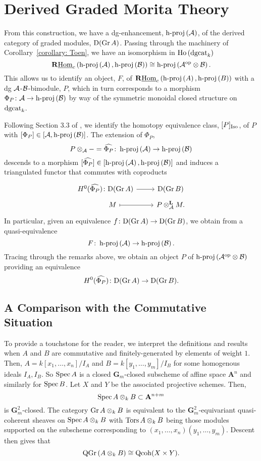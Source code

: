 \section{Derived Graded Morita Theory}
From this construction, we have a dg-enhancement, \(\operatorname{h-proj}\left(\mathcal{A}\right)\), of the derived category of graded modules, \(\mathrm{D}(\operatorname{Gr}A)\).
Passing through the machinery of Corollary~\ref{corollary: Toen}, we have an isomorphism in \(\operatorname{Ho}\left(\operatorname{dgcat}_k\right)\)
\[\mathbf{R}\underline{\operatorname{Hom}}_c\left(\operatorname{h-proj}\left(\mathcal{A}\right), \operatorname{h-proj}\left(\mathcal{B}\right)\right) \cong \operatorname{h-proj}\left(\mathcal{A}^{\operatorname{op}} \otimes \mathcal{B}\right).\]
This allows us to identify an object, \(F\), of \(\mathbf{R}\underline{\operatorname{Hom}}_c\left(\operatorname{h-proj}\left(A\right), \operatorname{h-proj}\left(B\right)\right)\) with a dg \(\mathcal{A}\)-\(\mathcal{B}\)-bimodule, \(P\), which in turn corresponds to a morphism \(\Phi_P \colon \mathcal{A} \to \operatorname{h-proj}\left(\mathcal{B}\right)\) by way of the symmetric monoidal closed structure on \(\operatorname{dgcat}_k\).

Following Section 3.3 of \cite{CS15}, we identify the homotopy equivalence class, \([P]_{\operatorname{Iso}}\), of \(P\) with \([\Phi_P] \in [\mathcal{A}, \operatorname{h-proj}\left(\mathcal{B}\right)]\).
The extension of \(\Phi_P\),
\[P \otimes_{\mathcal{A}} - = \widehat{\Phi_P} \colon \operatorname{h-proj}\left(\mathcal{A}\right) \to \operatorname{h-proj}\left(\mathcal{B}\right)\]
descends to a morphism \([\widehat{\Phi_P}] \in [\operatorname{h-proj}\left(\mathcal{A}\right), \operatorname{h-proj}\left(\mathcal{B}\right)]\)
and induces a triangulated functor that commutes with coproducts
\[\begin{tikzcd}[row sep=tiny]
H^0(\widehat{\Phi_P}) \colon \mathrm{D}(\Gr{A}) \arrow{r} & \mathrm{D}(\Gr{B})\\
\quad\quad M \arrow[mapsto]{r} & P \otimes_\A^\mathbf{L} M.
\end{tikzcd}\]
In particular, given an equivalence \(f \colon \mathrm{D}(\operatorname{Gr}A) \to \mathrm{D}(\operatorname{Gr}B)\), we obtain from \cite{Lunts-Orlov} a quasi-equivalence
\[F \colon \operatorname{h-proj}\left(\mathcal{A}\right) \to \operatorname{h-proj}\left(\mathcal{B}\right).\]
Tracing through the remarks above, we obtain an object \(P\) of \(\operatorname{h-proj}\left(\mathcal{A}^{\operatorname{op}} \otimes \mathcal{B}\right)\) providing an equivalence
\[H^0(\widehat{\Phi_P}) \colon \mathrm{D}(\operatorname{Gr}A) \to \mathrm{D}(\operatorname{Gr}B).\]

\subsection{A Comparison with the Commutative Situation}

To provide a touchstone for the reader, we interpret the definitions and results when \(A\) and \(B\) are commutative and finitely-generated by elements of weight \(1\). Then, \(A = k[x_1,\ldots,x_n]/I_A\) and \(B = k[y_1,\ldots,y_m]/I_B\) for some homogenous ideals \(I_A,I_B\). So \(\operatorname{Spec} A\) is a closed \(\mathbf{G}_m\)-closed subscheme of affine space \(\mathbf{A}^n\) and similarly for \(\operatorname{Spec} B\). Let \(X\) and \(Y\) be the associated projective schemes. Then, 
\begin{displaymath}
  \operatorname{Spec} A \otimes_k B \subset \mathbf{A}^{n+m}
\end{displaymath}
is \(\mathbf{G}_m^2\)-closed. The category \(\operatorname{Gr}A \otimes_k B\) is equivalent to the \(\mathbf{G}_m^2\)-equivariant quasi-coherent sheaves on \(\operatorname{Spec} A \otimes_k B\) with \(\operatorname{Tors}A \otimes_k B\) being those modules supported on the subscheme corresponding to \((x_1,\ldots,x_n)(y_1,\ldots,y_m)\). Descent then gives that 
\begin{displaymath}
  \operatorname{QGr}\left(A \otimes_k B\right) \cong \operatorname{Qcoh}(X \times Y). 
\end{displaymath}
